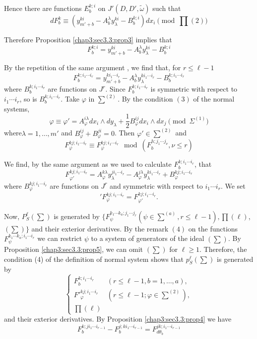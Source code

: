 Hence there are functions $E^{k;i}_{b}$ on $J' (D, D',
\tilde{\omega})$ such that 
$$
dF^k _b \equiv \left(y^{ki}_{m'+b}- A ^{\lambda}_b y_{\lambda}^{ki} -
B_b^{k;i}\right) dx_i \pmod {\prod (2)} 
$$

Therefore Proposition \ref{chap3:sec3.3:prop3} implies that
$$
F^{k;i}_b = y^{ki}_{m'+b}- A ^{\lambda}_b y_{\lambda}^{ki} - B_b^{k;i} 
$$

By the repetition of the same argument , we find that, for $r \leq \ell -1$
$$
F^{k; i_1 \cdots i_r}_b= y^{k i_1 \cdots i_r}_{m'+b} - A^{\lambda}_b
y_{\lambda}^{ki_1 \cdots i_r}-B^{k; i_1 \cdots i_r}_b 
$$
where $B^{k; i_1 \cdots i_r}_b$ are functions on $J^r$. Since $F^{k;
  i_1 \cdots i_r}_b$ is symmetric with respect to $i_1 \cdots i_r$, so
is $B^{k; i_1 \cdots i_r}_b$. Take $\varphi$ in $\sum^{(2)}$. By the
condition $(3)$ of the normal systems, 
$$
\varphi \equiv \varphi' = A^{ i\lambda}_{\varphi} dx_i \wedge
dy_{\lambda} + \frac{1}{2} B^{ij}_{\varphi} dx_i \wedge dx_j \pmod
{\Sigma^{(1)}}
$$
where\pageoriginale $\lambda = 1, \ldots, m'$ and $B^{ij}_\varphi + B^{ji}_{\varphi}
= 0$. Then $\varphi' \in \sum^{(2)}$ and  
$$
F^{kj; i_1 \cdots i_r}_{\varphi} \equiv F^{kj; i_1 \cdots
  i_r}_{\varphi} \mod (F^{h; j_1 \cdots j_\nu}_b , \nu \leq r) 
$$

We find, by the same argument as we used to calculate $F^{k; i_1
  \cdots i_r}_b$, that 
$$
F^{kj; i_1 \cdots i_r}_{\varphi'} = A^{k \lambda}_{\varphi} y^{ji_1
  \cdots i_r}_ \lambda - A^{j \lambda}_{\varphi} y^{ki_1 \cdots
  i_r}_{\lambda}+ B^{kj; i_1 \cdots i_r}_{\varphi} 
$$
where $B^{kj; i_1 \cdots i_r}_{\varphi}$ are functions on $J^r$ and
symmetric with respect to $i_1 \cdots i_r$. We set  
$$
'F^{kj; i_1 \cdots i_r}_{\varphi} = F^{kj; i_1 \cdots i_r}_{\varphi'}.
$$

Now, $P^{\ell}_S (\sum)$ is generated by $\{ F^{k_1 \cdots k_a ; j_1
  \cdots j_r}_{\psi} (\psi \in \sum^{(a)} , r \leq \ell -1), \prod
(\ell)$, $(\sum) \}$ and their exterior derivatives. By the remark
$(4)$ on the functions $F^{k_1 \cdots k_a ; i_1 \cdots i_r}_{\psi}$ we
can restrict $\psi$ to a system of generators of the ideal
$(\sum)$. By Proposition \ref{chap3:sec3.3:prop5}, we can omit $(\sum)$ for $\ell \geq
1$. Therefore, the condition (4) of the definition of normal system
shows that $p^{\ell}_S (\sum)$ is generated by  
$$
\begin{cases}
  F^{k;i_1 \cdots i_r}_{b} &(r \leq \ell -1, b=1 , \ldots, a),\\
  F'^{kj;i_1 \cdots i_r}_{\varphi} &(r \leq \ell -1 ; \varphi \in \sum^{(2)}),\\
  \prod(\ell)
\end{cases}
$$
and their exterior derivatives. By Proposition \ref{chap3:sec3.3:prop4} we have
$$
F^{k;ji_1 \cdots i_{r-1}}_{b} - F^{j;ki_1 \cdots i_{r-1}}_{b} =
F^{jk;i_1 \cdots i_{r-1}}_{d \theta _{b}} 
$$

